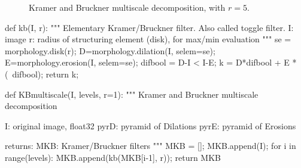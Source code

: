 \begin{figure}[htbp]
\centering\caption{Kramer and Bruckner multiscale decomposition, with $r=5$.}%
 \hfill
 \hfill
 \label{fig:multiscale:python:KB}%
\end{figure}

\begin{python}
def kb(I, r):
    """
    Elementary Kramer/Bruckner filter. Also called toggle filter.
    I: image
    r: radius of structuring element (disk), for max/min evaluation
    """
    se = morphology.disk(r);
    D=morphology.dilation(I, selem=se);
    E=morphology.erosion(I, selem=se);
    difbool = D-I < I-E; 
    k = D*difbool + E * (~difbool);
    return k;
\end{python}

\begin{python}
def KBmultiscale(I, levels, r=1):
    """
    Kramer and Bruckner multiscale decomposition
    
    I: original image, float32
    pyrD: pyramid of Dilations
    pyrE: pyramid of Erosions
    
    returns: MKB: Kramer/Bruckner filters
    """
    MKB = [];
    MKB.append(I);
    for i in range(levels):
        MKB.append(kb(MKB[i-1], r));
    return MKB
\end{python}


